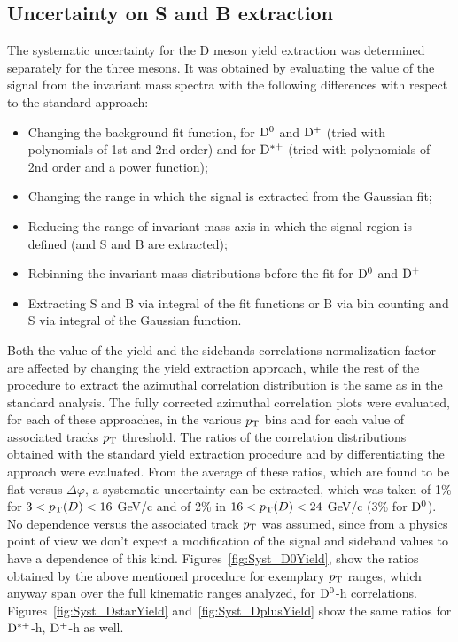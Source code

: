 \subsection{Uncertainty on S and B extraction}
The systematic uncertainty for the D meson yield extraction was determined separately for the three mesons. It was obtained by evaluating the value of the signal from the invariant mass spectra with the following differences with respect to the standard approach:
\begin{itemize}
    \item Changing the background fit function, for ${\rm D^0}$ and ${\rm D^+}$ (tried with polynomials of 1st and 2nd order) and for ${\rm D^{*+}}$ (tried with polynomials of 2nd order and a power function);
    \item Changing the range in which the signal is extracted from the Gaussian fit;
    \item Reducing the range of invariant mass axis in which the signal region is defined (and S and B are extracted);
    \item Rebinning the invariant mass distributions before the fit for ${\rm D^0}$ and ${\rm D^+}$
    \item Extracting S and B via integral of the fit functions or B via bin counting and S via integral of the Gaussian function.
\end{itemize}

Both the value of the yield and the sidebands correlations normalization factor are affected by changing the yield extraction approach, while the rest of the procedure to extract the azimuthal correlation distribution is the same as in the standard analysis. The fully corrected azimuthal correlation plots were evaluated, for each of these approaches, in the various $p_{\rm T}$ bins and for each value of associated tracks $p_{\rm T}$ threshold.
The ratios of the correlation distributions obtained with the standard yield extraction procedure and by differentiating the approach were evaluated. From the average of these ratios, which are found to be flat versus $\Delta\varphi$, a systematic uncertainty can be extracted, which was taken of 1\% for $3 < p_{\rm T}(D) < 16$ GeV/c and of 2\% in $16 < p_{\rm T}(D) < 24$ GeV/c (3\% for ${\rm D^0}$). No dependence versus the associated track $p_{\rm T}$ was assumed, since from a physics point of view we don't expect a modification of the signal and sideband values to have a dependence of this kind.
Figures~\ref{fig:Syst_D0Yield}, show the ratios obtained by the above mentioned procedure for exemplary $p_{\rm T}$ ranges, which anyway span over the full kinematic ranges analyzed, for ${\rm D^0}$-h correlations. Figures~\ref{fig:Syst_DstarYield} and~\ref{fig:Syst_DplusYield} show the same ratios for ${\rm D^{*+}}$-h, ${\rm D^+}$-h as well.

